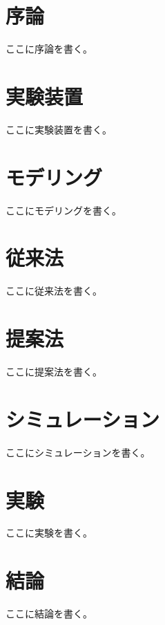 \documentclass[11pt,a4paper,oneside,onecolumn,fleqn,dvipdfmx]{jsarticle}
\begin{document}
\thispagestyle{empty}
\begin{center}
    \vspace*{20pt}
    {\fontsize{60pt}{0pt}\selectfont{卒業論文}}
    \vskip 60pt
    {\fontsize{40pt}{0pt}\selectfont{題目}}
    \vskip 60pt
    {\fontsize{30pt}{0pt}\selectfont{yyyy年mm月dd日 \ 提出}}
    \vskip 60pt
    {\fontsize{30pt}{0pt}\selectfont{指導教員}}
    \vskip 20pt
    {\fontsize{30pt}{0pt}\selectfont{堀 洋一 教授}}
    \vskip 10pt
    {\fontsize{30pt}{0pt}\selectfont{藤本 博志 准教授}}
    \vskip 60pt
    {\fontsize{30pt}{0pt}\selectfont{電気電子工学科}}
    \vskip 40pt
    {\fontsize{30pt}{0pt}\selectfont{00-000000\ \ 名前}}
\end{center}
\clearpage

\tableofcontents
\clearpage

\listoffigures
\listoftables
\clearpage

\section{序論}
ここに序論を書く。

\section{実験装置}
ここに実験装置を書く。

\section{モデリング}
ここにモデリングを書く。

\section{従来法}
ここに従来法を書く。

\section{提案法}
ここに提案法を書く。

\section{シミュレーション}
ここにシミュレーションを書く。

\section{実験}
ここに実験を書く。

\section{結論}
ここに結論を書く。



\end{document}
